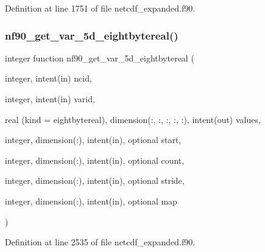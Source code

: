 Definition at line 1751 of file netcdf\+\_\+expanded.\+f90.

\mbox{\label{netcdf__expanded_8f90_aae07754ee86547390a27c32217020ea9}} 
\subsubsection{\texorpdfstring{nf90\+\_\+get\+\_\+var\+\_\+5d\+\_\+eightbytereal()}{nf90\_get\_var\_5d\_eightbytereal()}}
{\footnotesize\ttfamily integer function nf90\+\_\+get\+\_\+var\+\_\+5d\+\_\+eightbytereal (\begin{DoxyParamCaption}\item[{integer, intent(in)}]{ncid,  }\item[{integer, intent(in)}]{varid,  }\item[{real (kind = eightbytereal), dimension(\+:, \+:, \+:, \+:, \+:), intent(out)}]{values,  }\item[{integer, dimension(\+:), intent(in), optional}]{start,  }\item[{integer, dimension(\+:), intent(in), optional}]{count,  }\item[{integer, dimension(\+:), intent(in), optional}]{stride,  }\item[{integer, dimension(\+:), intent(in), optional}]{map }\end{DoxyParamCaption})}



Definition at line 2535 of file netcdf\+\_\+expanded.\+f90.

\mbox{\label{netcdf__expanded_8f90_a5be0de164b8f9734a8c2a45896b84a19}} 
